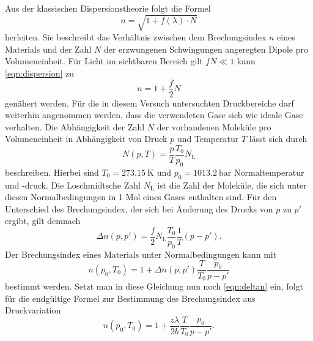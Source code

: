 Aus der klassischen Dispersionstheorie folgt die Formel
\begin{equation}
    n = \sqrt{1 + f(\lambda) \cdot N}
    \label{eqn:dispersion}
\end{equation}
herleiten. Sie beschreibt das Verhältnis zwischen dem Brechungsindex $n$ eines Materials und der Zahl $N$ der erzwungenen 
Schwingungen angeregten Dipole pro Volumeneinheit. Für Licht im sichtbaren Bereich gilt $fN \ll 1$ kann \autoref{eqn:dispersion}
zu 
\begin{equation}
    n = 1 + \frac{f}{2} N
\end{equation}
genähert werden. Für die in diesem Versuch untersuchten Druckbereiche darf weiterhin angenommen werden, dass die verwendeten Gase 
sich wie ideale Gase verhalten. Die Abhängigkeit der Zahl $N$ der vorhandenen Moleküle pro Volumeneinheit in Abhängigkeit von Druck $p$ und 
Temperatur $T$ lässt sich durch
\begin{equation}
    N(p,T) = \frac{p}{T} \frac{T_0}{p_0} N_\text{L}
\end{equation}
beschreiben. Hierbei sind $T_0 = \SI{273,15}{\kelvin}$ und $p_0 = \SI{1013,2}{\bar}$ Normaltemperatur und -druck. 
Die Loschmidtsche Zahl $N_\text{L}$ ist die Zahl der Moleküle, die sich unter diesen Normalbedingungen in 1 Mol eines
Gases enthalten sind. 
Für den Unterschied des Brechungsindex, der sich bei Änderung des Drucks von $p$ zu $p'$ ergibt, gilt demnach
\begin{equation}
    \Delta n(p,p') = \frac{f}{2} N_\text{L} \frac{T_0}{p_0} \frac{1}{T} (p-p') .
\end{equation}
Der Brechungsindex eines Materials unter Normalbedingungen kann mit
\begin{equation}
    n(p_0,T_0) = 1 + \Delta n (p,p') \frac{T}{T_0} \frac{p_0}{p-p'}
\end{equation}
bestimmt werden. Setzt man in diese Gleichung nun noch \autoref{eqn:deltan} ein, folgt für die endgültige Formel zur Bestimmung des
Brechungsindex aus Druckvariation
\begin{equation}
    n(p_0, T_0) = 1 + \frac{z\lambda}{2b} \frac{T}{T_0} \frac{p_0}{p-p'} .
\end{equation}

\cite{sample}

